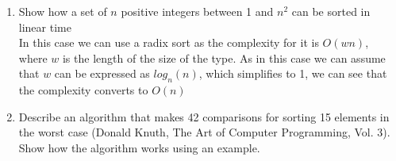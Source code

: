 \documentclass{article}
\begin{document}
\begin{enumerate}
\begin{enumerate}
    \end{enumerate}

    \item Show how a set of $n$ positive integers between 1 and $n^2$ can be sorted in linear time\\
    In this case we can use a radix sort as the complexity for it is $O(wn)$, where $w$ is the length of the size of the type. As in this case we can assume that $w$ can be expressed as $log_n(n)$, which simplifies to 1, we can see that the complexity converts to $O(n)$
    \item Describe an algorithm that makes 42 comparisons for sorting 15 elements in the worst case (Donald Knuth, The Art of Computer Programming, Vol. 3). Show how the algorithm works using an example.
\end{enumerate}
\end{document}
